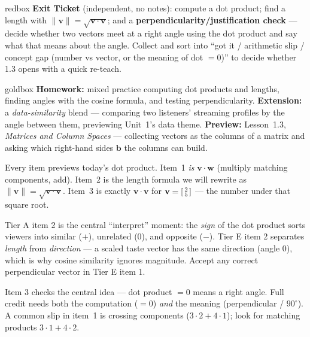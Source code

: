 \documentclass[10pt]{article}
\newcommand{\vv}{\mathbf{v}}
\newcommand{\ww}{\mathbf{w}}
\begin{document}
\begin{skillbox}{redbox}
\textbf{Exit Ticket} (independent, no notes): compute a dot product; find a length with
$\|\vv\|=\sqrt{\vv\cdot\vv}$; and a \textbf{perpendicularity/justification check} --- decide
whether two vectors meet at a right angle using the dot product and say what that means about the
angle. Collect and sort into ``got it / arithmetic slip / concept gap (number vs vector, or the
meaning of dot $=0$)'' to decide whether 1.3 opens with a quick re-teach.
\end{skillbox}

\begin{skillbox}{goldbox}
\textbf{Homework:} mixed practice computing dot products and lengths, finding angles with the
cosine formula, and testing perpendicularity. \textbf{Extension:} a \emph{data-similarity}
blend --- comparing two listeners' streaming profiles by the angle between them, previewing
Unit~1's data theme. \textbf{Preview:} Lesson~1.3, \emph{Matrices and Column Spaces} --- collecting
vectors as the columns of a matrix and asking which right-hand sides $\mathbf{b}$ the columns can
build.
\end{skillbox}

\begin{teachernote}[Warm-Up]
Every item previews today's dot product. Item~1 \emph{is} $\vv\cdot\ww$ (multiply matching
components, add). Item~2 is the length formula we will rewrite as $\|\vv\|=\sqrt{\vv\cdot\vv}$.
Item~3 is exactly $\vv\cdot\vv$ for $\vv=\begin{bsmallmatrix} 2\\5 \end{bsmallmatrix}$ --- the
number under that square root.
\end{teachernote}

\begin{teachernote}
Tier A item 2 is the central ``interpret'' moment: the \emph{sign} of the dot product sorts
viewers into similar ($+$), unrelated ($0$), and opposite ($-$). Tier E item 2 separates
\emph{length} from \emph{direction} --- a scaled taste vector has the same direction (angle $0$), which
is why cosine similarity ignores magnitude. Accept any correct perpendicular vector in Tier E
item 1.
\end{teachernote}

\begin{teachernote}
Item 3 checks the central idea --- dot product $=0$ means a right angle. Full credit needs both
the computation ($=0$) \emph{and} the meaning (perpendicular / $90^\circ$). A common slip in
item~1 is crossing components ($3\cdot2+4\cdot1$); look for matching products $3\cdot1+4\cdot2$.
\end{teachernote}
\end{document}
